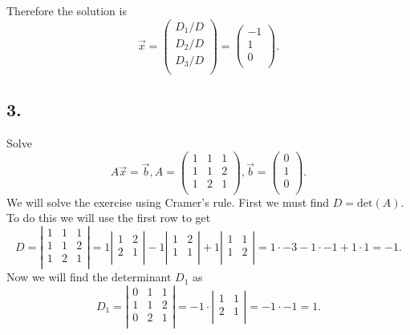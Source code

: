 Therefore the solution is
\[ 
\Vec{x} = \begin{pmatrix}
D_1 / D\\
D_2 / D\\
D_3 / D\\
\end{pmatrix} = \begin{pmatrix}
-1\\
1\\
0\\
\end{pmatrix}
.\]




\subsection*{3.}
Solve
\[ 
A \Vec{x} = \Vec{b}, A = \begin{pmatrix}
1 & 1 & 1\\
1 & 1 & 2\\
1 & 2 & 1\\
\end{pmatrix}, \Vec{b} = \begin{pmatrix}
0\\
1\\
0\\
\end{pmatrix}
.\]
\bigbreak
We will solve the exercise using Cramer's rule. First we must find $D = \mathrm{det}(A)$. To do this we will use the first row to get
\[ 
D = \left| \begin{array}{ccc}
1 & 1 & 1\\
1 & 1 & 2\\
1 & 2 & 1\\
\end{array} \right| = 1 \left| \begin{array}{cc}
1 & 2\\
2 & 1\\
\end{array} \right| - 1 \left| \begin{array}{cc}
1 & 2\\
1 & 1\\
\end{array} \right| + 1 \left| \begin{array}{cc}
1 & 1\\
1 & 2\\
\end{array} \right| = 1 \cdot -3 - 1 \cdot -1 + 1 \cdot 1 = -1
.\]
Now we will find the determinant $D_1$ as
\[ 
D_1 = \left| \begin{array}{ccc}
0 & 1 & 1\\
1 & 1 & 2\\
0 & 2 & 1\\
\end{array} \right| = -1 \cdot \left| \begin{array}{cc}
1 & 1\\
2 & 1\\
\end{array} \right| = -1 \cdot -1 = 1
.\]
